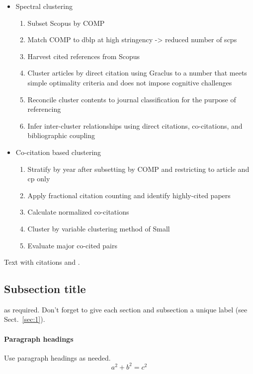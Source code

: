 \begin{itemize}
\item Spectral clustering
\begin{enumerate}
\item Subset Scopus by COMP
\item Match COMP to dblp at high stringency -> reduced number of scps
 \item Harvest cited references  from Scopus
 \item Cluster articles by direct citation using Graclus to a number that meets simple optimality criteria and does not impose cognitive challenges
 \item Reconcile cluster contents to journal classification for the purpose of referencing
 \item Infer inter-cluster relationships using direct citations, co-citations, and bibliographic coupling
\end{enumerate}
\item Co-citation based clustering
\begin{enumerate}
\item Stratify by year after subsetting by COMP and restricting to article and cp only
\item Apply fractional citation counting and identify highly-cited papers
\item Calculate normalized co-citations
\item Cluster by variable clustering method of Small
\item Evaluate major co-cited pairs
\end{enumerate}
\end{itemize}


Text with citations \cite{RefB} and \cite{RefJ}.

\subsection{Subsection title}
\label{sec:2}
as required. Don't forget to give each section
and subsection a unique label (see Sect.~\ref{sec:1}).
\paragraph{Paragraph headings} Use paragraph headings as needed.
\begin{equation}
a^2+b^2=c^2
\end{equation}

